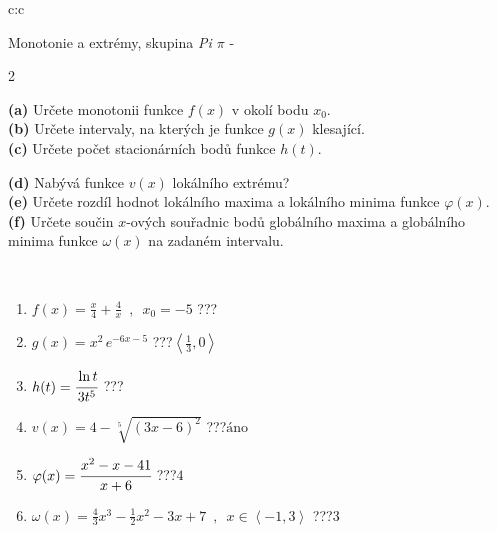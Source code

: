 \documentclass[10pt]{report}
\begin{document}
\newpage
\thispagestyle{empty}
\begin{tabular}{c:c}
\begin{minipage}[c][104.5mm][t]{0.5\linewidth}
\begin{center}
\vspace{7mm}
{\huge Monotonie a extrémy, skupina \textit{Pi $\pi$} -}\\[5mm]
\begin{minipage}{0.95\linewidth}
\begin{center}
{\small \begin{multicols}{2} \raggedright
\textbf{(a)} Určete monotonii funkce \(f(x)\) v okolí bodu \(x_0\). \\[1mm]
\textbf{(b)} Určete intervaly, na kterých je funkce \(g(x)\) klesající. \\[1mm]
\textbf{(c)} Určete počet stacionárních bodů funkce \(h(t)\). \par \columnbreak
\textbf{(d)} Nabývá funkce \(v(x)\) lokálního extrému? \\[1mm]
\textbf{(e)} Určete rozdíl hodnot lokálního maxima a lokálního minima funkce \(\varphi(x)\). \\[1mm]
\textbf{(f)} Určete součin \(x\)-ových souřadnic bodů globálního maxima a globálního minima funkce \(\omega(x)\) na zadaném intervalu. \\[1mm]
\end{multicols}
}
\end{center}
\end{minipage}
\\[4mm]
\begin{minipage}{0.79\linewidth}
\begin{center}
\begin{varwidth}{\linewidth}
\begin{enumerate}
\normalsize
\item $f(x)=\frac{x}{4}+\frac{4}{x} \enspace , \enspace x_0=-5$\quad \dotfill\; ???\;\dotfill \quad {}
\item $g(x)=x^2\, e^{-6x-5}$\quad \dotfill\; ???\;\dotfill \quad $\left\langle\frac{1}{3} , 0\right\rangle$
\item $h(t)=\cfrac{\ln t}{3t^5}$\quad \dotfill\; ???\;\dotfill {}
\item $v(x)=4-\sqrt[5]{(3x-6)^2}$\quad \dotfill\; ???\;\dotfill \quad $\text{áno}$
\item $\varphi(x)=\cfrac{x^2-x-41}{x+6}$\quad \dotfill\; ???\;\dotfill \quad $4$
\item $\omega(x)=\frac{4}{3}x^3-\frac{1}{2}x^2-3x+7 \enspace , \enspace x\in\left\langle-1 , 3\right\rangle$\quad \dotfill\; ???\;\dotfill \quad $3$

\end{enumerate}
\end{varwidth}
\end{center}
\end{minipage}
\end{center}
\end{minipage}
\end{tabular}
\end{document}
